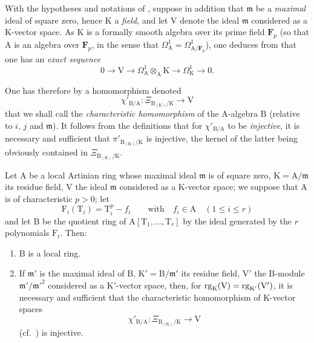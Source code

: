 \begin{env}[22.4.6]
\label{0.22.4.6}
With the hypotheses and notations of , suppose in addition that $\mathfrak{m}$ be a \emph{maximal} ideal of square zero, hence $\mathrm{K}$ a \emph{field}, and let $\mathrm{V}$ denote the ideal $\mathfrak{m}$ considered as a $\mathrm{K}$-vector space.
As $\mathrm{K}$ is a formally smooth algebra over its prime field $\mathbf{F}_p$  (so that $\mathrm{A}$ is an algebra over $\mathbf{F}_p$, in the sense that $\Omega^1_\mathrm{A}=\Omega^1_{\mathrm{A}/\mathbf{F}_p}$), one deduces from  that one has an \emph{exact sequence}
\[
\label{0.22.4.6.1}
  0\to\mathrm{V}\to\Omega^1_\mathrm{A}\otimes_\mathrm{A}\mathrm{K}\to\Omega^1_\mathrm{K}\to 0.
  \tag{22.4.6.1}
\]

One has therefore by  a homomorphism denoted
\[
\label{0.22.4.6.2}
  \chi'_{\mathrm{B}/\mathrm{A}}:\Xi_{\mathrm{B}_{(\mathrm{K})}/\mathrm{K}}\to\mathrm{V}
  \tag{22.4.6.2}
\]
that we shall call the \emph{characteristic homomorphism} of the $\mathrm{A}$-algebra $\mathrm{B}$ (relative to $i$, $j$ and $\mathfrak{m}$).
It follows from the definitions that for $\chi'_{\mathrm{B}/\mathrm{A}}$ to be \emph{injective}, it is necessary and sufficient that $\pi'_{\mathrm{B}_{(\mathrm{K})}/\mathrm{K}}$ is injective, the kernel of the latter being obviously contained in $\Xi_{\mathrm{B}_{(\mathrm{K})}/\mathrm{K}}$.
\end{env}

\begin{proposition}[22.4.7]
\label{0.22.4.7}
Let $\mathrm{A}$ be a local Artinian ring whose maximal ideal $\mathfrak{m}$ is of square zero, $\mathrm{K}=\mathrm{A}/\mathfrak{m}$ its residue field, $\mathrm{V}$ the ideal $\mathfrak{m}$ considered as a $\mathrm{K}$-vector space; we suppose that $\mathrm{A}$ is of characteristic $p>0$; let
\[
\label{0.22.4.7.1}
  \mathrm{F}_i(\mathrm{T}_i)=\mathrm{T}_i^p-f_i\qquad\text{with}\quad f_i\in\mathrm{A}\quad(1\leq i\leq r)
  \tag{22.4.7.1}
\]
and let $\mathrm{B}$ be the quotient ring of $\mathrm{A}[\mathrm{T}_1,\ldots,\mathrm{T}_r]$ by the ideal generated by the $r$ polynomials $\mathrm{F}_i$.
Then:
\begin{enumerate}
  \item[\rm{(i)}] $\mathrm{B}$ is a local ring.
  \item[\rm{(ii)}] If $\mathfrak{m}'$ is the maximal ideal of $\mathrm{B}$, $\mathrm{K}'=\mathrm{B}/\mathfrak{m}'$ its residue field, $\mathrm{V}'$ the $\mathrm{B}$-module $\mathfrak{m}'/\mathfrak{m}'^2$ considered as a $\mathrm{K}'$-vector space, then, for $\operatorname{rg}_\mathrm{K}(\mathrm{V})=\operatorname{rg}_{\mathrm{K}'}(\mathrm{V}')$, it is necessary and sufficient that the characteristic homomorphism of $\mathrm{K}$-vector spaces
\[
\label{0.22.4.7.2}
  \chi'_{\mathrm{B}/\mathrm{A}}:\Xi_{\mathrm{B}_{(\mathrm{K})}/\mathrm{K}}\to\mathrm{V}
  \tag{22.4.7.2}
\]
  (cf.~) is injective.
\end{enumerate}
\end{proposition}

